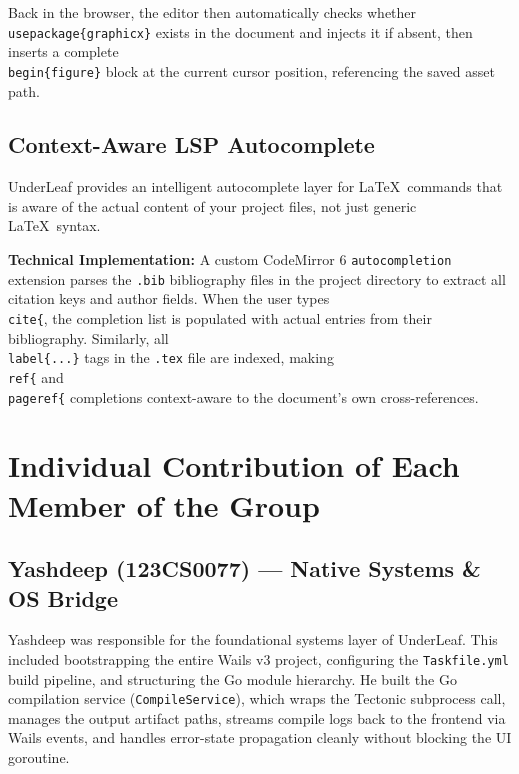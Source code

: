 \documentclass[11pt, a4paper]{article}
\begin{document}
Back in the browser, the editor then automatically checks whether \texttt{\\usepackage\{graphicx\}} exists in the document and injects it if absent, then inserts a complete \texttt{\\begin\{figure\}} block at the current cursor position, referencing the saved asset path.

\subsection{Context-Aware LSP Autocomplete}

UnderLeaf provides an intelligent autocomplete layer for \LaTeX\ commands that is aware of the actual content of your project files, not just generic \LaTeX\ syntax.

\textbf{Technical Implementation:} A custom CodeMirror 6 \texttt{autocompletion} extension parses the \texttt{.bib} bibliography files in the project directory to extract all citation keys and author fields. When the user types \texttt{\\cite\{}, the completion list is populated with actual entries from their bibliography. Similarly, all \texttt{\\label\{...\}} tags in the \texttt{.tex} file are indexed, making \texttt{\\ref\{} and \texttt{\\pageref\{} completions context-aware to the document's own cross-references.

\section{Individual Contribution of Each Member of the Group}

\subsection{Yashdeep (123CS0077) — Native Systems \& OS Bridge}

Yashdeep was responsible for the foundational systems layer of UnderLeaf. This included bootstrapping the entire Wails v3 project, configuring the \texttt{Taskfile.yml} build pipeline, and structuring the Go module hierarchy. He built the Go compilation service (\texttt{CompileService}), which wraps the Tectonic subprocess call, manages the output artifact paths, streams compile logs back to the frontend via Wails events, and handles error-state propagation cleanly without blocking the UI goroutine.
\end{document}
